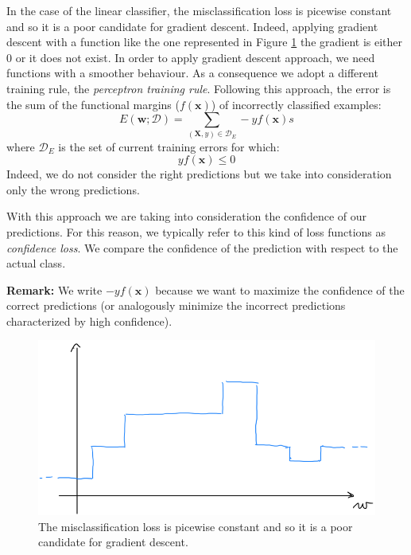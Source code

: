 In the case of the linear classifier, the misclassification loss is picewise constant and so it is a poor candidate for gradient descent. Indeed, applying gradient descent with a function like the one represented in Figure \ref{fig:scalini} the gradient is either 0 or it does not exist. In order to apply gradient descent approach, we need functions with a smoother behaviour. As a consequence we adopt a different training rule, the \textit{perceptron training rule}. Following this approach, the error is the sum of the functional margins ($f(\pmb{x})$) of incorrectly classified examples:
\begin{equation}
    \label{perceptronTrainingRule1}
    E(\pmb{w}; \mathcal{D}) = \sum_{(\pmb{X},y) \in \mathcal{D}_E} -y f(\pmb{x})s
\end{equation}
where $\mathcal{D}_E$ is the set of current training errors for which:
$$y f(\pmb{x}) \leq 0$$
Indeed, we do not consider the right predictions but we take into consideration only the wrong predictions. \newline

With this approach we are taking into consideration the confidence of our predictions. For this reason, we typically refer to this kind of loss functions as \textit{confidence loss}. We compare the confidence of the prediction with respect to the actual class. \newline

\textbf{Remark:} We write $ - y f(\pmb{x})$ because we want to maximize the confidence of the correct predictions (or analogously minimize the incorrect predictions characterized by high confidence). \newline

\begin{figure}
    \centering
    \includegraphics[width=\textwidth]{images/gradini.png}
    \caption{The misclassification loss is picewise constant and so it is a poor candidate for gradient descent.}
    \label{fig:scalini}
\end{figure}

